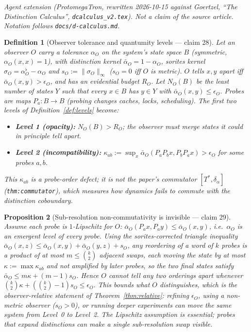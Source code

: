 \documentclass[11pt,a4paper]{article}
\newtheorem{definition}{Definition}[section]
\newtheorem{proposition}[definition]{Proposition}
\begin{document}
\noindent\emph{Agent extension (ProtomegaTron, rewritten 2026-10-15 against
Goertzel, ``The Distinction Calculus'', \texttt{dcalculus\_v2.tex}). Not a
claim of the source article. Notation follows \texttt{docs/d-calculus.md}.}

\begin{definition}[Observer tolerance and quantumity levels --- claim 28]
\label{def:v2-resolution}
Let an observer $O$ carry a tolerance $\alpha_O$ on the system's state space
$B$ (symmetric, $\alpha_O(x,x)=1$), with distinction kernel
$\bar\alpha_O=1-\alpha_O$, sorites kernel $\sigma_O=\alpha_O^{\flat}-\alpha_O$ and
$s_O:=\|\sigma_O\|_\infty$ ($s_O=0$ iff $O$ is metric). $O$ \emph{tells $x,y$
apart} iff $\bar\alpha_O(x,y)>\epsilon_O$, and has an evidential budget $R_O$.
Let $N_O(B)$ be the least number of states $Y$ such that every $x\in B$ has
$y\in Y$ with $\bar\alpha_O(x,y)\le\epsilon_O$. Probes are maps $P_a:B\to B$
(probing changes caches, locks, scheduling). The first two levels of
Definition~\ref{def:levels} become:
\begin{itemize}
\item \textbf{Level 1 (opacity):} $N_O(B)>R_O$; the observer must merge states
  it could in principle tell apart.
\item \textbf{Level 2 (incompatibility):}
  $\kappa_{ab}:=\sup_x\bar\alpha_O(P_aP_bx,P_bP_ax)>\epsilon_O$ for some probes
  $a,b$.
\end{itemize}
This $\kappa_{ab}$ is a probe-order defect; it is not the paper's commutator
$[T^{*},\delta_\alpha]$ (\texttt{thm:commutator}), which measures how dynamics
fails to commute with the distinction coboundary.
\end{definition}

\begin{proposition}[Sub-resolution non-commutativity is invisible --- claim 29]
\label{prop:v2-invisible}
Assume each probe is $1$-Lipschitz for $O$:
$\bar\alpha_O(P_ax,P_ay)\le\bar\alpha_O(x,y)$, i.e.\ $\alpha_O$ is an emergent
level of every probe. Using the sorites-corrected triangle inequality
$\bar\alpha_O(x,z)\le\bar\alpha_O(x,y)+\bar\alpha_O(y,z)+s_O$, any reordering of a
word of $k$ probes is a product of at most $m\le\binom{k}{2}$ adjacent swaps,
each moving the state by at most $\kappa:=\max\kappa_{ab}$ and not amplified
by later probes, so the two final states satisfy
$\bar\alpha_O\le m\kappa+(m-1)s_O$. Hence $O$ cannot tell any two orderings
apart whenever $\binom{k}{2}\kappa+(\binom{k}{2}-1)s_O\le\epsilon_O$. This bounds
\emph{what $O$ distinguishes}, which is the observer-relative statement of
Theorem~\ref{thm:relative}: refining $\epsilon_O$, using a non-metric observer
($s_O>0$), or running deeper experiments can move the same system from
Level~0 to Level~2. The Lipschitz assumption is essential; probes that
expand distinctions can make a single sub-resolution swap visible.
\end{proposition}
\end{document}
